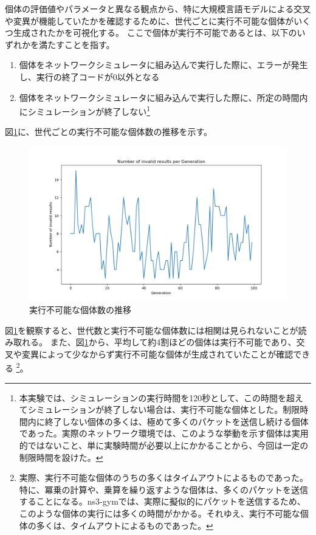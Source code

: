 \documentclass[a4paper,11pt]{jreport}
\newcommand{\figref}[1]{図\ref{#1}}
\begin{document}
個体の評価値やパラメータと異なる観点から、特に大規模言語モデルによる交叉や変異が機能していたかを確認するために、世代ごとに実行不可能な個体がいくつ生成されたかを可視化する。
ここで個体が実行不可能であるとは、以下のいずれかを満たすことを指す。
\begin{enumerate}
  \item 個体をネットワークシミュレータに組み込んで実行した際に、エラーが発生し、実行の終了コードが0以外となる
  \item 個体をネットワークシミュレータに組み込んで実行した際に、所定の時間内にシミュレーションが終了しない\footnote{本実験では、シミュレーションの実行時間を120秒として、この時間を超えてシミュレーションが終了しない場合は、実行不可能な個体とした。制限時間内に終了しない個体の多くは、極めて多くのパケットを送信し続ける個体であった。実際のネットワーク環境では、このような挙動を示す個体は実用的ではないこと、単に実験時間が必要以上にかかることから、今回は一定の制限時間を設けた。}
\end{enumerate}
\figref{figure:invalid_results}に、世代ごとの実行不可能な個体数の推移を示す。
\begin{figure}[htbp]
  \setlength\fboxsep{0pt}
  \centering
  \includegraphics[width=1.0\linewidth]{fig/chap05/invalid_results.png}
  \caption{実行不可能な個体数の推移}
  \label{figure:invalid_results}
\end{figure}
\figref{figure:invalid_results}を観察すると、世代数と実行不可能な個体数には相関は見られないことが読み取れる。
また、\figref{figure:invalid_results}から、平均して約4割ほどの個体は実行不可能であり、交叉や変異によって少なからず実行不可能な個体が生成されていたことが確認できる
\footnote{実際、実行不可能な個体のうちの多くはタイムアウトによるものであった。特に、冪乗の計算や、乗算を繰り返すような個体は、多くのパケットを送信することになる。ns3-gymでは、実際に擬似的にパケットを送信するため、このような個体の実行には多くの時間がかかる。それゆえ、実行不可能な個体の多くは、タイムアウトによるものであった。}。
\end{document}
